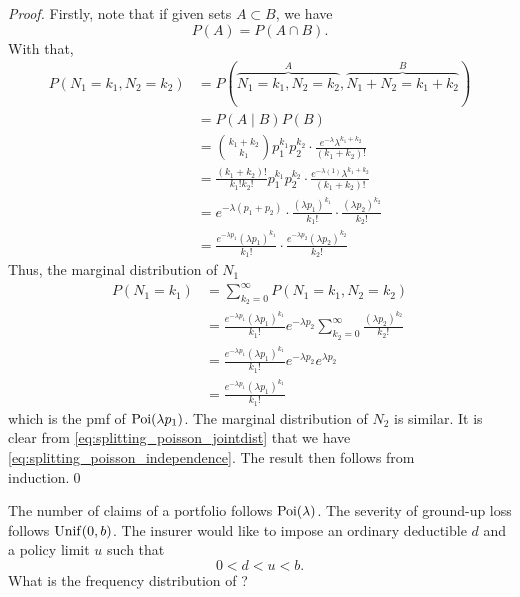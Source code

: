 \documentclass[notoc,notitlepage]{tufte-book}
\begin{document}
\begin{proof}
  Firstly, note that if given sets $A \subset B$, we have
  \begin{equation*}
    P(A) = P(A \cap B).
  \end{equation*}
  With that,
  \begin{align}
    P(N_1 = k_1, N_2 = k_2) &= P(\overbrace{N_1 = k_1, N_2 = k_2}^{A}, \overbrace{N_1 + N_2 = k_1 + k_2}^{B}) \nonumber \\
                            &= P(A \mid B) P(B) \nonumber \\
                            &= \binom{k_1 + k_2}{k_1} p_1^{k_1} p_2^{k_2} \cdot \frac{e^{-\lambda} \lambda^{k_1 + k_2}}{(k_1 + k_2)!} \nonumber \\
                            &= \frac{(k_1 + k_2)!}{k_1! k_2!} p_1^{k_1} p_2^{k_2} \cdot \frac{e^{-\lambda (1)} \lambda^{k_1 + k_2}}{(k_1 + k_2)!} \nonumber \\
                            &= e^{-\lambda (p_1 + p_2)} \cdot \frac{(\lambda p_1)^{k_1}}{k_1!} \cdot \frac{(\lambda p_2)^{k_2}}{k_2!} \nonumber \\
                            &= \frac{e^{-\lambda p_1} (\lambda p_1)^{k_1}}{k_1!} \cdot \frac{e^{-\lambda p_2} (\lambda p_2)^{k_2}}{k_2!} \label{eq:splitting_poisson_jointdist}
  \end{align}
  Thus, the marginal distribution of $N_1$
  \begin{align*}
    P(N_1 = k_1) &= \sum_{k_2 = 0}^{\infty} P(N_1 = k_1, N_2 = k_2) \\
                 &= \frac{e^{-\lambda p_1} (\lambda p_1)^{k_1}}{k_1!} e^{-\lambda p_2} \sum_{k_2 = 0}^{\infty} \frac{(\lambda p_2)^{k_2}}{k_2!} \\
                 &= \frac{e^{-\lambda p_1} (\lambda p_1)^{k_1}}{k_1!} e^{-\lambda p_2} e^{\lambda p_2} \\
                 &= \frac{e^{-\lambda p_1} (\lambda p_1)^{k_1}}{k_1!}
  \end{align*}
  which is the pmf of $\operatorname{Poi}(\lambda p_1)$. The marginal distribution of $N_2$ is similar. It is clear from \cref{eq:splitting_poisson_jointdist} that we have \cref{eq:splitting_poisson_independence}. The result then follows from induction.\qed\
\end{proof}

\begin{eg}
  The number of claims of a portfolio follows $\operatorname{Poi}(\lambda)$. The severity of ground-up loss follows $\operatorname{Unif}(0, b)$. The insurer would like to impose an ordinary deductible $d$ and a policy limit $u$ such that
  \begin{equation*}
    0 < d < u < b.
  \end{equation*}
  What is the frequency distribution of ?
\end{eg}
\end{document}
